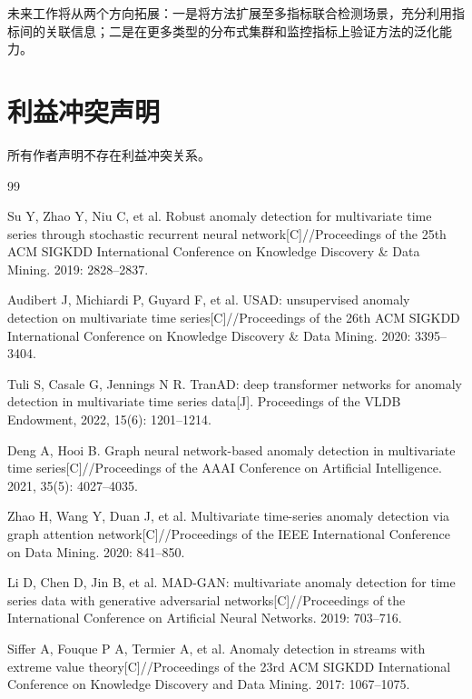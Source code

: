 \documentclass[10.5pt,a4paper,twocolumn]{ctexart}
\begin{document}
未来工作将从两个方向拓展：一是将方法扩展至多指标联合检测场景，充分利用指标间的关联信息；二是在更多类型的分布式集群和监控指标上验证方法的泛化能力。

\section*{利益冲突声明}
所有作者声明不存在利益冲突关系。


\begin{thebibliography}{99}

Su Y, Zhao Y, Niu C, et al. Robust anomaly detection for multivariate time series through stochastic recurrent neural network[C]//Proceedings of the 25th ACM SIGKDD International Conference on Knowledge Discovery \& Data Mining. 2019: 2828--2837.

Audibert J, Michiardi P, Guyard F, et al. USAD: unsupervised anomaly detection on multivariate time series[C]//Proceedings of the 26th ACM SIGKDD International Conference on Knowledge Discovery \& Data Mining. 2020: 3395--3404.

Tuli S, Casale G, Jennings N R. TranAD: deep transformer networks for anomaly detection in multivariate time series data[J]. Proceedings of the VLDB Endowment, 2022, 15(6): 1201--1214.

Deng A, Hooi B. Graph neural network-based anomaly detection in multivariate time series[C]//Proceedings of the AAAI Conference on Artificial Intelligence. 2021, 35(5): 4027--4035.

Zhao H, Wang Y, Duan J, et al. Multivariate time-series anomaly detection via graph attention network[C]//Proceedings of the IEEE International Conference on Data Mining. 2020: 841--850.

Li D, Chen D, Jin B, et al. MAD-GAN: multivariate anomaly detection for time series data with generative adversarial networks[C]//Proceedings of the International Conference on Artificial Neural Networks. 2019: 703--716.

Siffer A, Fouque P A, Termier A, et al. Anomaly detection in streams with extreme value theory[C]//Proceedings of the 23rd ACM SIGKDD International Conference on Knowledge Discovery and Data Mining. 2017: 1067--1075.

\end{thebibliography}
\end{document}
